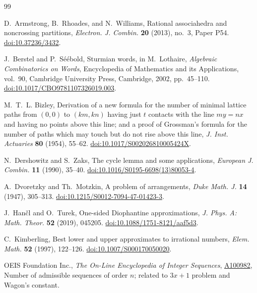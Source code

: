 \documentclass[11pt]{article}
\begin{document}
\begin{thebibliography}{99}

D.~Armstrong, B.~Rhoades, and N.~Williams,
\newblock Rational associahedra and noncrossing partitions,
\newblock \emph{Electron. J. Combin.} \textbf{20} (2013), no.~3, Paper P54.
\newblock \href{https://doi.org/10.37236/3432}{doi:10.37236/3432}.

J.~Berstel and P.~S\'e\'ebold,
\newblock Sturmian words,
\newblock in M.~Lothaire, \emph{Algebraic Combinatorics on Words},
Encyclopedia of Mathematics and its Applications, vol.~90,
Cambridge University Press, Cambridge, 2002, pp.~45--110.
\newblock \href{https://doi.org/10.1017/CBO9781107326019.003}{doi:10.1017/CBO9781107326019.003}.

M.~T.~L. Bizley,
\newblock Derivation of a new formula for the number of minimal lattice
paths from \((0,0)\) to \((km,kn)\) having just \(t\) contacts with the
line \(my=nx\) and having no points above this line; and a proof of
Grossman's formula for the number of paths which may touch but do not rise
above this line,
\newblock \emph{J. Inst. Actuaries} \textbf{80} (1954), 55--62.
\newblock \href{https://doi.org/10.1017/S002026810005424X}{doi:10.1017/S002026810005424X}.

N.~Dershowitz and S.~Zaks,
\newblock The cycle lemma and some applications,
\newblock \emph{European J. Combin.} \textbf{11} (1990), 35--40.
\newblock \href{https://doi.org/10.1016/S0195-6698(13)80053-4}{doi:10.1016/S0195-6698(13)80053-4}.

A.~Dvoretzky and Th.~Motzkin,
\newblock A problem of arrangements,
\newblock \emph{Duke Math. J.} \textbf{14} (1947), 305--313.
\newblock \href{https://doi.org/10.1215/S0012-7094-47-01423-3}{doi:10.1215/S0012-7094-47-01423-3}.

J.~Han\v{c}l and O.~Turek,
\newblock One-sided Diophantine approximations,
\newblock \emph{J. Phys. A: Math. Theor.} \textbf{52} (2019), 045205.
\newblock \href{https://doi.org/10.1088/1751-8121/aaf5d3}{doi:10.1088/1751-8121/aaf5d3}.


C.~Kimberling,
\newblock Best lower and upper approximates to irrational numbers,
\newblock \emph{Elem. Math.} \textbf{52} (1997), 122--126.
\newblock \href{https://doi.org/10.1007/S000170050020}{doi:10.1007/S000170050020}.

OEIS Foundation Inc.,
\newblock \emph{The On-Line Encyclopedia of Integer Sequences},
\newblock \href{https://oeis.org/A100982}{A100982},
Number of admissible sequences of order \(n\); related to \(3x+1\)
problem and Wagon's constant.


\end{thebibliography}
\end{document}
